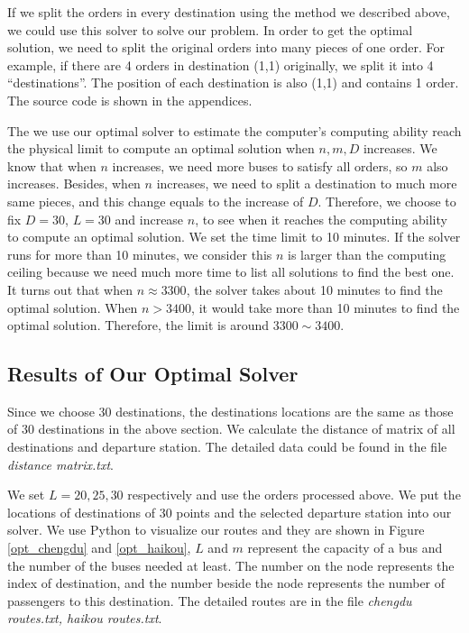 \documentclass{llncs}
\begin{document}
	If we split the orders in every destination using the method we described above, we could use this solver to solve our problem. In order to get the optimal solution, we need to split the original orders into many pieces of one order. For example, if there are 4 orders in destination (1,1) originally, we split it into 4 ``destinations''. The position of each destination is also (1,1) and contains 1 order. The source code is shown in the appendices.
	
	The we use our optimal solver to estimate the computer's computing ability reach the physical limit to compute an optimal solution when $n,m,D$ increases. We know that when $n$ increases, we need more buses to satisfy all orders, so $m$ also increases. Besides, when $n$ increases, we need to split a destination to much more same pieces, and this change equals to the increase of $D$. Therefore, we choose to fix $D=30$, $L=30$ and increase $n$, to see when it reaches the computing ability to compute an optimal solution. We set the time limit to 10 minutes. If the solver runs for more than 10 minutes, we consider this $n$ is larger than the computing ceiling because we need much more time to list all solutions to find the best one. It turns out that when $n\approx3300$, the solver takes about 10 minutes to find the optimal solution. When $n>3400$, it would take more than 10 minutes to find the optimal solution. Therefore, the limit is around $3300\sim 3400$.
	
\subsection{Results of Our Optimal Solver}
    Since we choose 30 destinations, the destinations locations are the same as those of 30 destinations in the above section. We calculate the distance of matrix of all destinations and departure station. The detailed data could be found in the file \textit{distance matrix.txt}.

    We set $L=20,25,30$ respectively and use the orders processed above. We put the locations of destinations of 30 points and the selected departure station into our solver. We use Python to visualize our routes and they are shown in Figure \ref{opt_chengdu} and \ref{opt_haikou}, $L$ and $m$ represent the capacity of a bus and the number of the buses needed at least. The number on the node represents the index of destination, and the number beside the node represents the number of passengers to this destination. The detailed routes are in the file \textit{chengdu routes.txt, haikou routes.txt}.
	
\end{document}
